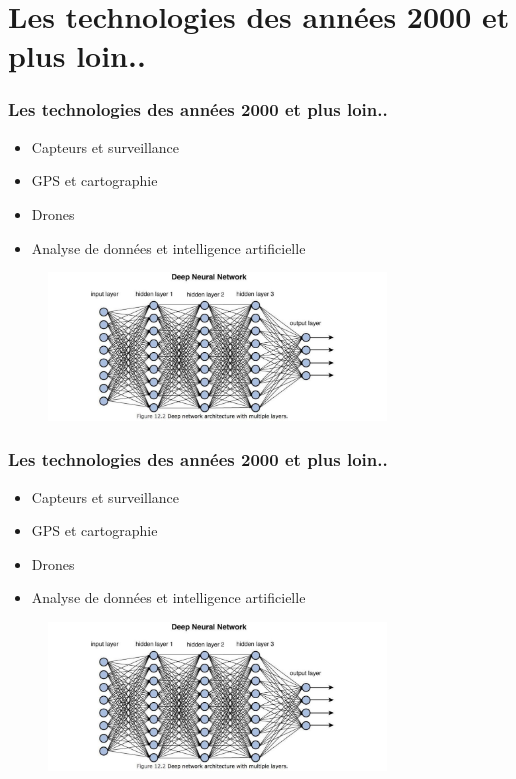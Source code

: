 \documentclass{beamer}
\begin{document}
	\section{Les technologies des années 2000 et plus loin..}
	
	\begin{frame}
	\frametitle{Les technologies des années 2000 et plus loin..}
	\begin{itemize}
		\item Capteurs et surveillance
		\item GPS et cartographie
		\item Drones
		\item Analyse de données et intelligence artificielle
	\end{itemize}
	
	\begin{figure}
		\includegraphics[width=0.8\textwidth]{neuron}
		\label{fig:example}
	\end{figure}
	
\end{frame}


	\begin{frame}
	\frametitle{Les technologies des années 2000 et plus loin..}
	\begin{itemize}
		\item \alert{Capteurs et surveillance}
		\item GPS et cartographie
		\item Drones
		\item Analyse de données et intelligence artificielle
	\end{itemize}
	
	\begin{figure}
		\includegraphics[width=0.8\textwidth]{neuron}
		\label{fig:example}
	\end{figure}
	
\end{frame}
\end{document}
